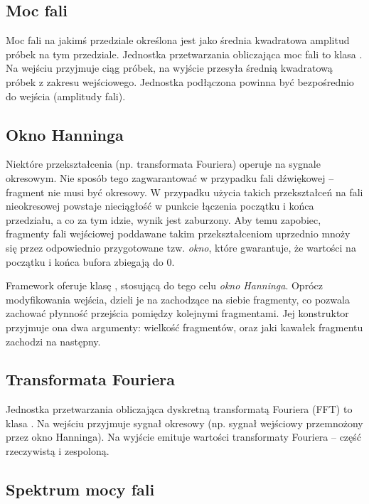\subsection{Moc fali}

Moc fali na jakimś przedziale określona jest jako średnia kwadratowa amplitud próbek na tym
przedziale. Jednostka przetwarzania obliczająca moc fali to klasa . Na wejściu przyjmuje
ciąg próbek, na wyjście przesyła średnią kwadratową próbek z zakresu wejściowego.  Jednostka
podłączona powinna być bezpośrednio do wejścia (amplitudy fali).

\subsection{Okno Hanninga}

Niektóre przekształcenia (np. transformata Fouriera) operuje na sygnale okresowym. Nie sposób tego
zagwarantować w przypadku fali dźwiękowej -- fragment nie musi być okresowy. W przypadku użycia
takich przekształceń na fali nieokresowej powstaje nieciągłość w punkcie łączenia początku i końca
przedziału, a co za tym idzie, wynik jest zaburzony. Aby temu zapobiec, fragmenty fali wejściowej
poddawane takim przekształceniom uprzednio mnoży się przez odpowiednio przygotowane tzw.
\emph{okno}, które gwarantuje, że wartości na początku i końca bufora zbiegają do 0.

Framework oferuje klasę , stosującą do tego celu \emph{okno Hanninga}.
Oprócz modyfikowania wejścia, dzieli je na zachodzące na siebie fragmenty, co pozwala zachować
płynność przejścia pomiędzy kolejnymi fragmentami. Jej konstruktor przyjmuje ona dwa argumenty:
wielkość fragmentów, oraz jaki kawałek fragmentu zachodzi na następny.

\subsection{Transformata Fouriera}

Jednostka przetwarzania obliczająca dyskretną transformatą Fouriera (FFT) to klasa . Na
wejściu przyjmuje sygnał okresowy (np. sygnał wejściowy przemnożony przez okno Hanninga). Na wyjście
emituje wartości transformaty Fouriera -- część rzeczywistą i zespoloną.

\subsection{Spektrum mocy fali}

